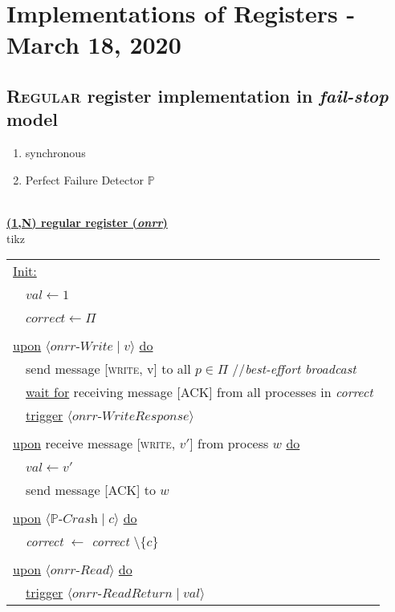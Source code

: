 \documentclass{article}
\begin{document}
	\newpage
	
	\section{Implementations of Registers - March 18, 2020}
	\begin{adjustwidth}{2em}{2em}
		\subsection{\textsc{Regular} register implementation in \textit{fail-stop} model}
		\begin{adjustwidth}{2em}{2em}
			\begin{enumerate}[-]
				\item synchronous
				\item Perfect Failure Detector $\mathbb{P}$
			\end{enumerate} 
			\hfill \\
			\underline{\textbf{(1,N) regular register (\textit{onrr})}} \\
			tikz \\
			\begin{tabular}{l}
				\underline{Init:} \\
				\ \ $val \leftarrow 1$ \\
				\ \ $correct \leftarrow \Pi$ \\
				\\
				\underline{upon} $\langle \textit{onrr-Write} \mid v \rangle$ \underline{do} \\
				\ \ send message [\textsc{write}, v] to all $p \in \Pi$ //\textit{best-effort broadcast} \\
				\ \ \underline{wait for} receiving message [\textsc{ACK}] from all processes in \textit{correct} \\
				\ \ \underline{trigger} $\langle \textit{onrr-WriteResponse} \rangle$ \\
				\\
				\underline{upon} receive message [\textsc{write}, $v'$] from process $w$ \underline{do} \\
				\ \ $val \leftarrow v'$ \\
				\ \ send message [\textsc{ACK}] to $w$ \\
				\\
				\underline{upon} $\langle \mathbb{P}\textit{-Crash} \mid c \rangle$ \underline{do} \\
				\ \ \textit{correct} $\leftarrow$ \textit{correct $\setminus \{ c \}$ } \\
				\\
				\underline{upon} $\langle \textit{onrr-Read} \rangle$ \underline{do} \\
				\ \ \underline{trigger} $\langle \textit{onrr-ReadReturn} \mid \textit{val} \rangle$
			\end{tabular}
		\end{adjustwidth}
		\newpage

\end{adjustwidth}
\end{document}
